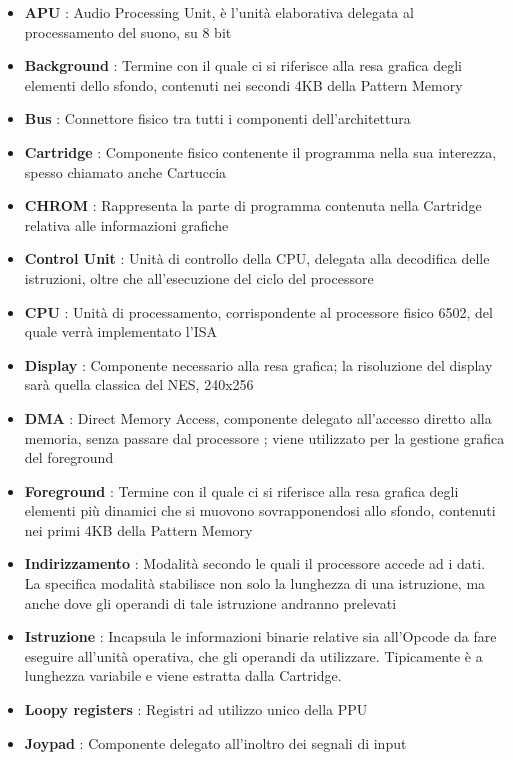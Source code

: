 \documentclass[11pt]{article}
\begin{document}
\begin{itemize}
\item{
	\textbf{APU }: Audio Processing Unit, è l'unità elaborativa delegata al processamento del suono, su 8 bit
}
\item{
	\textbf{Background} : Termine con il quale ci si riferisce alla resa grafica degli elementi dello sfondo, contenuti nei secondi 4KB della Pattern Memory
}
\item{
	\textbf{Bus} : Connettore fisico tra tutti i componenti dell'architettura
}
\item{
	\textbf{Cartridge} : Componente fisico contenente il programma nella sua interezza, spesso chiamato anche Cartuccia
}
\item{
	\textbf{CHROM }: Rappresenta la parte di programma contenuta nella Cartridge relativa alle informazioni grafiche
}
\item{
	\textbf{Control Unit }: Unità di controllo della CPU, delegata alla decodifica delle istruzioni, oltre che all'esecuzione del ciclo del processore
}
\item{
	\textbf{CPU }: Unità di processamento, corrispondente al processore fisico 6502, del quale verrà implementato l'ISA
}
\item{
	\textbf{Display }: Componente necessario alla resa grafica; la risoluzione del display sarà quella classica del NES, 240x256
}
\item{
	\textbf{DMA }: Direct Memory Access, componente delegato all'accesso diretto alla memoria, senza passare dal processore ; viene utilizzato per la gestione grafica del foreground
}
\item{
	\textbf{Foreground }: Termine con il quale ci si riferisce alla resa grafica degli elementi più dinamici che si muovono sovrapponendosi allo sfondo, contenuti nei primi 4KB della Pattern Memory
}
\item{
	\textbf{Indirizzamento }: Modalità secondo le quali il processore accede ad i dati. La specifica modalità stabilisce non solo la lunghezza di una istruzione, ma anche dove gli operandi di tale istruzione andranno prelevati
}
\item{
	\textbf{Istruzione }: Incapsula le informazioni binarie relative sia all'Opcode da fare eseguire all'unità operativa, che gli operandi da utilizzare. Tipicamente è a lunghezza variabile e viene estratta dalla Cartridge.
}
\item{
	\textbf{Loopy registers }: Registri ad utilizzo unico della PPU
}
\item{
	\textbf{Joypad }: Componente delegato all'inoltro dei segnali di input
}
\end{itemize}
\end{document}
